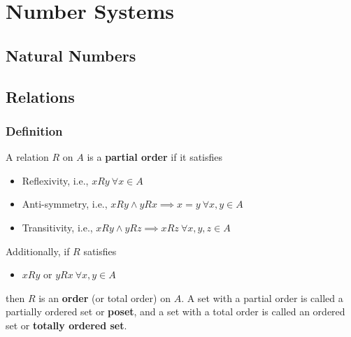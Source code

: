 \section{Number Systems}

\subsection{Natural Numbers}

\subsection{Relations}

\subsubsection{Definition}
\begin{true}
A relation $R$ on $A$ is a \textbf{partial order} if it satisfies
\begin{itemize}
    \item Reflexivity, i.e., $xRy \ \forall x \in A$
    \item Anti-symmetry, i.e., $xRy \land yRx \implies x = y \ \forall x,y \in A$
    \item Transitivity, i.e., $xRy \land yRz \implies xRz \ \forall x,y,z \in A$
\end{itemize}
Additionally, if $R$ satisfies
\begin{itemize}
    \item $xRy$ or $yRx \ \forall x,y \in A$
\end{itemize}
then $R$ is an \textbf{order} (or total order) on $A$. A set with a partial order is called a partially ordered set or \textbf{poset}, and a set with a total order is called an ordered set or \textbf{totally ordered set}.
\end{true}
